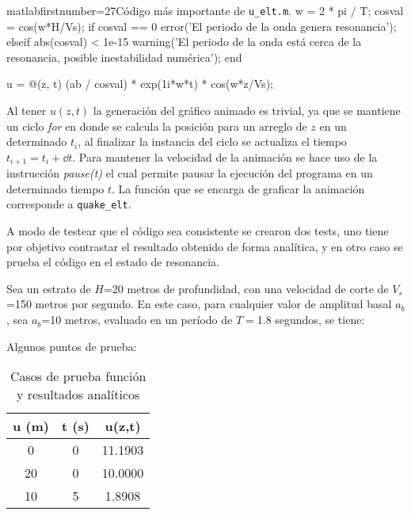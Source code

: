 \begin{sourcecodep}{matlab}{firstnumber=27}{Código más importante de \texttt{u\_elt.m}.}
w = 2 * pi / T;
cosval = cos(w*H/Vs);
if cosval == 0
	error('El periodo de la onda genera resonancia');
elseif abs(cosval) < 1e-15
	warning('El periodo de la onda está cerca de la resonancia, posible inestabilidad numérica');
end

u = @(z, t) (ab / cosval) * exp(1i*w*t) * cos(w*z/Vs);
\end{sourcecodep}

Al tener $u(z,t)$ la generación del gráfico animado es trivial, ya que se mantiene un ciclo \textit{for} en donde se calcula la posición para un arreglo de $z$ en un determinado $t_i$, al finalizar la instancia del ciclo se actualiza el tiempo $t_{i+1} = t_{i} + \dd t$. Para mantener la velocidad de la animación se hace uso de la instrucción \textit{pause(t)} el cual permite pausar la ejecución del programa en un determinado tiempo $t$. La función que se encarga de graficar la animación corresponde a \texttt{quake\_elt}.


A modo de testear que el código sea consistente se crearon dos tests, uno tiene por objetivo contrastar el resultado obtenido de forma analítica, y en otro caso se prueba el código en el estado de resonancia.


Sea un estrato de $H$=20 metros de profundidad, con una velocidad de corte de $V_s$=150 metros por segundo. En este caso, para cualquier valor de amplitud basal $a_b$, sea $a_b$=10 metros, evaluado en un período de $T=$1.8 segundos, se tiene:


Algunos puntos de prueba:

\begin{table}[H]
	\centering
	\caption{Casos de prueba función y resultados analíticos}
	\begin{tabular}{ccc}
		\hline
		u (m) & t (s) & u(z,t) \bigstrut\\
		\hline
		0     & 0     & 11.1903 \bigstrut[t]\\
		20    & 0     & 10.0000 \\
		10    & 5     & 1.8908 \\
	\end{tabular}
\end{table}

